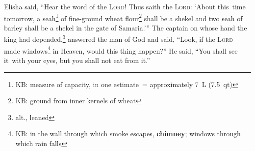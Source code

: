 
\begin{inparaenum}
     Elisha said, ``Hear the word of the \textsc{Lord}! Thus saith the \textsc{Lord}: `About this\understood\ time tomorrow, a seah\footnote{KB: measure of capacity, in one estimate~= approximately 7~L (7.5~qt)} of fine-ground wheat flour\footnote{KB: ground from inner kernels of wheat} shall be a shekel and two seah of barley shall be a shekel in the gate of Samaria.'\thinspace''%
     The captain on whose hand the king had depended,\footnote{alt., leaned} answered the man of God and said, ``Look, if the \textsc{Lord} made windows\footnote{KB: in the wall through which smoke escapes, \textbf{chimney}; windows through which rain falls} in Heaven, would this thing happen?'' He said, ``You shall see it\understood\ with your eyes, but you shall not eat from it.''%
    

\end{inparaenum}
